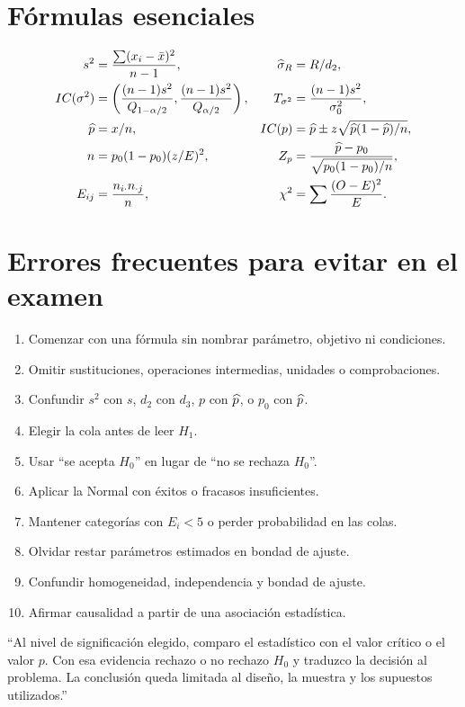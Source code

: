 \documentclass[11pt,a4paper]{article}
\begin{document}
\section{Fórmulas esenciales}
\begin{align*}
s^2&=\frac{\sum(x_i-\bar x)^2}{n-1},&\widehat\sigma_R&=R/d_2,\\
IC(\sigma^2)&=\left(\frac{(n-1)s^2}{Q_{1-\alpha/2}},\frac{(n-1)s^2}{Q_{\alpha/2}}\right),&T_{\sigma^2}&=\frac{(n-1)s^2}{\sigma_0^2},\\
\widehat p&=x/n,&IC(p)&=\widehat p\pm z\sqrt{\widehat p(1-\widehat p)/n},\\
n&=p_0(1-p_0)(z/E)^2,&Z_p&=\frac{\widehat p-p_0}{\sqrt{p_0(1-p_0)/n}},\\
E_{ij}&=\frac{n_{i\cdot}n_{\cdot j}}n,&\chi^2&=\sum\frac{(O-E)^2}E.
\end{align*}

\section{Errores frecuentes para evitar en el examen}
\begin{enumerate}
\item Comenzar con una fórmula sin nombrar parámetro, objetivo ni condiciones.
\item Omitir sustituciones, operaciones intermedias, unidades o comprobaciones.
\item Confundir $s^2$ con $s$, $d_2$ con $d_3$, $p$ con $\widehat p$, o $p_0$ con $\widehat p$.
\item Elegir la cola antes de leer $H_1$.
\item Usar ``se acepta $H_0$'' en lugar de ``no se rechaza $H_0$''.
\item Aplicar la Normal con éxitos o fracasos insuficientes.
\item Mantener categorías con $E_i<5$ o perder probabilidad en las colas.
\item Olvidar restar parámetros estimados en bondad de ajuste.
\item Confundir homogeneidad, independencia y bondad de ajuste.
\item Afirmar causalidad a partir de una asociación estadística.
\end{enumerate}
\begin{oral}
``Al nivel de significación elegido, comparo el estadístico con el valor crítico o el valor $p$. Con esa evidencia rechazo o no rechazo $H_0$ y traduzco la decisión al problema. La conclusión queda limitada al diseño, la muestra y los supuestos utilizados.''
\end{oral}
\end{document}
